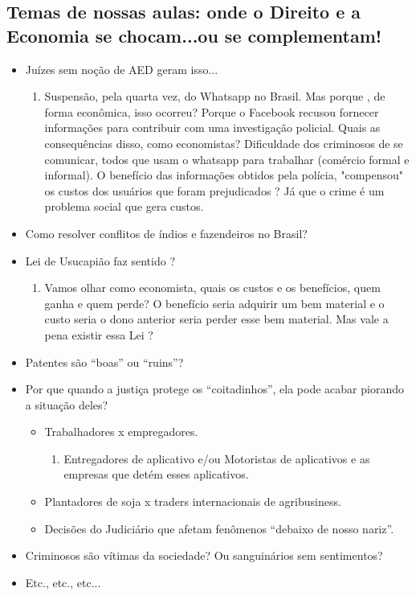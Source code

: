 \documentclass[a4paper,12pt]{article}[abntex2]
\begin{document}
\subsection{\textbf{Temas de nossas aulas: onde o Direito e a Economia se chocam...ou se complementam!}}
\begin{itemize}
    \item Juízes sem noção de AED geram isso... \begin{enumerate}
        \item Suspensão, pela quarta vez, do Whatsapp no Brasil. Mas porque , de forma econômica, isso ocorreu? Porque o Facebook recusou fornecer informações para contribuir com uma investigação policial. Quais as consequências disso, como economistas? Dificuldade dos criminosos de se comunicar, todos que usam o whatsapp para trabalhar (comércio formal e informal). O benefício das informações obtidos pela polícia, "compensou" os custos dos usuários que foram prejudicados ? Já que o crime é um problema social que gera custos. 
    \end{enumerate}
    \item Como resolver conflitos de índios e fazendeiros no Brasil?
    \item Lei de Usucapião faz sentido ? \begin{enumerate}
        \item Vamos olhar como economista, quais os custos e os benefícios, quem ganha e quem perde? O benefício seria adquirir um bem material e o custo seria o dono anterior seria perder esse bem material. Mas vale a pena existir essa Lei ?  
    \end{enumerate}
    \item Patentes são “boas” ou “ruins”?
    \item Por que quando a justiça protege os “coitadinhos”, ela pode acabar piorando a situação deles?\begin{itemize}
        \item Trabalhadores x empregadores. \begin{enumerate}
            \item Entregadores de aplicativo e/ou Motoristas de aplicativos e as empresas que detém esses aplicativos.
        \end{enumerate}
        \item Plantadores de soja x traders internacionais de agribusiness.
        \item Decisões do Judiciário que afetam fenômenos “debaixo de nosso nariz”.
    \end{itemize}
    \item Criminosos são vítimas da sociedade? Ou sanguinários sem sentimentos? 
    \item Etc., etc., etc...
\end{itemize}
\end{document}

